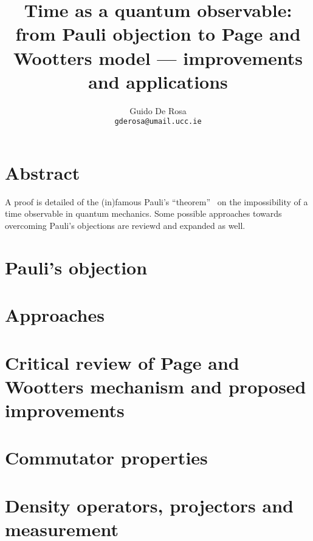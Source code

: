 \documentclass{book}
\author{Guido De Rosa \\ \small\tt{gderosa@umail.ucc.ie}}
\title{Time as a quantum observable: from Pauli objection to Page and Wootters model --- improvements and applications}
\begin{document}
\maketitle

\chapter*{Abstract}
A proof is detailed of the (in)famous Pauli's ``theorem''~\cite{PauliFootnote}
on the impossibility of a time observable in quantum mechanics. Some possible
approaches towards overcoming Pauli's objections are reviewd and expanded as well.

\chapter{Pauli's objection}



\chapter{Approaches}


\chapter{Critical review of Page and Wootters mechanism and proposed improvements}


\appendix
\chapter{Commutator properties}

\chapter{Density operators, projectors and measurement}




\end{document}
